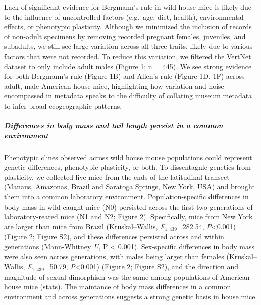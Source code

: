 \documentclass[]{article}
\let\oldsubparagraph\subparagraph
\renewcommand{\subparagraph}[1]{\oldsubparagraph{#1}\mbox{}}
\begin{document}
Lack of significant evidence for Bergmann's rule in wild house mice is
likely due to the influence of uncontrolled factors (e.g.~age, diet,
health), environmental effects, or phenotypic plasticity. Although we
minimized the inclusion of records of non-adult specimens by removing
recorded pregnant females, juveniles, and subadults, we still see large
variation across all three traits, likely due to various factors that
were not recorded. To reduce this variation, we filtered the VertNet
dataset to only include adult males (Figure 1; n = 445). We see strong
evidence for both Bergmann's rule (Figure 1B) and Allen's rule (Figure
1D, 1F) across adult, male American house mice, highlighting how
variation and noise encompassed in metadata speaks to the difficulty of
collating museum metadata to infer broad ecogeographic patterns.

\hypertarget{differences-in-body-mass-and-tail-length-persist-in-a-common-environment}{%
\subparagraph{\texorpdfstring{\emph{Differences in body mass and tail
length persist in a common
environment}}{Differences in body mass and tail length persist in a common environment}}\label{differences-in-body-mass-and-tail-length-persist-in-a-common-environment}}

Phenotypic clines observed across wild house mouse populations could
represent genetic differences, phenotypic plasticity, or both. To
dissentagnle genetics from plasticity, we collected live mice from the
ends of the latitudinal transect (Manaus, Amazonas, Brazil and Saratoga
Springs, New York, USA) and brought them into a common laboratory
environment. Population-specific differences in body mass in wild-caught
mice (N0) persisted across the first two generations of
laboratory-reared mice (N1 and N2; Figure 2). Specifically, mice from
New York are larger than mice from Brazil (Kruskal--Wallis,
\emph{F}\(_{1,439}\)=282.54, \emph{P}\textless{}0.001) (Figure 2; Figure
S2), and these differences persisted across and within generations
(Mann-Whitney \emph{U}, P \textless{} 0.001). Sex-specific differences
in body mass were also seen across generations, with males being larger
than females (Kruskal--Wallis, \emph{F}\(_{1,439}\)=50.79,
\emph{P}\textless{}0.001) (Figure 2; Figure S2), and the direction and
magnitude of sexual dimorphism was the same among populations of
American house mice (stats). The maintance of body mass differences in a
common environment and across generations suggests a strong genetic
basis in house mice.
\end{document}
